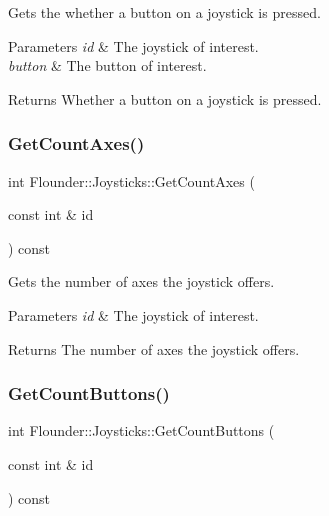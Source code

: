 Gets the whether a button on a joystick is pressed. 


\begin{DoxyParams}{Parameters}
{\em id} & The joystick of interest. \\
\hline
{\em button} & The button of interest. \\
\hline
\end{DoxyParams}
\begin{DoxyReturn}{Returns}
Whether a button on a joystick is pressed. 
\end{DoxyReturn}
\mbox{\label{class_flounder_1_1_joysticks_a52bbd93ad4cd39e07f163b0f87eaadf6}} 
\subsubsection{\texorpdfstring{Get\+Count\+Axes()}{GetCountAxes()}}
{\footnotesize\ttfamily int Flounder\+::\+Joysticks\+::\+Get\+Count\+Axes (\begin{DoxyParamCaption}\item[{const int \&}]{id }\end{DoxyParamCaption}) const\hspace{0.3cm}{\ttfamily [inline]}}



Gets the number of axes the joystick offers. 


\begin{DoxyParams}{Parameters}
{\em id} & The joystick of interest. \\
\hline
\end{DoxyParams}
\begin{DoxyReturn}{Returns}
The number of axes the joystick offers. 
\end{DoxyReturn}
\mbox{\label{class_flounder_1_1_joysticks_a25cca50c5d9d1081880ed4f4c0ee38e8}} 
\subsubsection{\texorpdfstring{Get\+Count\+Buttons()}{GetCountButtons()}}
{\footnotesize\ttfamily int Flounder\+::\+Joysticks\+::\+Get\+Count\+Buttons (\begin{DoxyParamCaption}\item[{const int \&}]{id }\end{DoxyParamCaption}) const\hspace{0.3cm}{\ttfamily [inline]}}



